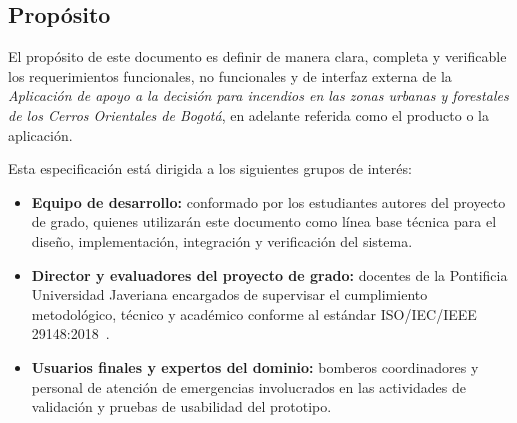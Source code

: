\subsection{Propósito}

El propósito de este documento es definir de manera clara, completa y verificable los requerimientos funcionales, no funcionales y de interfaz externa de la \textit{Aplicación de apoyo a la decisión para incendios en las zonas urbanas y forestales de los Cerros Orientales de Bogotá}, en adelante referida como el producto o la aplicación. 

Esta especificación está dirigida a los siguientes grupos de interés:
\begin{itemize}
    \item \textbf{Equipo de desarrollo:} conformado por los estudiantes autores del proyecto de grado, quienes utilizarán este documento como línea base técnica para el diseño, implementación, integración y verificación del sistema.
    \item \textbf{Director y evaluadores del proyecto de grado:} docentes de la Pontificia Universidad Javeriana encargados de supervisar el cumplimiento metodológico, técnico y académico conforme al estándar ISO/IEC/IEEE 29148:2018\textcolor{black}{~\cite{iso29148_2018}}.
    \item \textbf{Usuarios finales y expertos del dominio:} bomberos coordinadores y personal de atención de emergencias involucrados en las actividades de validación y pruebas de usabilidad del prototipo.
\end{itemize}
